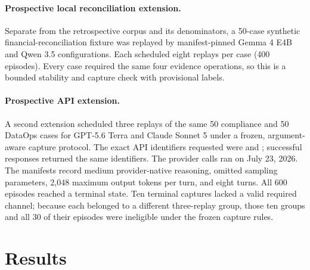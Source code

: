 \documentclass{article}
\begin{document}
\paragraph{Prospective local reconciliation extension.}
Separate from the retrospective corpus and its denominators, a 50-case synthetic
financial-reconciliation fixture was replayed by manifest-pinned Gemma 4 E4B
and Qwen 3.5 configurations.  Each scheduled eight replays per case (400
episodes).  Every case required the same four evidence operations, so this is
a bounded stability and capture check with provisional labels.

\paragraph{Prospective API extension.}
A second extension scheduled three replays of the same 50 compliance and 50
DataOps cases for GPT-5.6 Terra and Claude Sonnet 5 under a frozen,
argument-aware capture protocol.  The exact API identifiers requested were
 and ; successful responses
returned the same identifiers.  The provider calls ran on July 23, 2026.  The
manifests record medium provider-native reasoning, omitted sampling parameters,
2,048 maximum output tokens per turn, and eight turns.  All 600 episodes
reached a terminal state.
Ten terminal captures lacked a valid required channel; because each belonged
to a different three-replay group, those ten groups and all 30 of their
episodes were ineligible under the frozen capture rules.

\section{Results}
\end{document}

